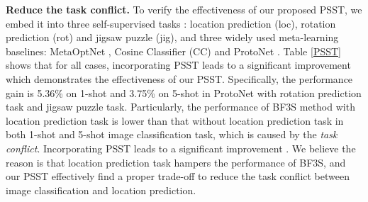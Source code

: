 \documentclass[final]{cvpr}
\begin{document}
\begin{table}[] 
	\centering
	\caption{Few-shot image classification average accuracy (\%)
		comparison with state-of-the-arts with 95\% confidence intervals on CIFAR-FS.}\label{CIFARcom}
\end{table}



\textbf{Reduce the task conflict.} 
To verify the effectiveness of our proposed PSST, we embed it into three self-supervised tasks : location prediction (loc), rotation prediction (rot) and jigsaw puzzle (jig), and three widely used meta-learning baselines: MetaOptNet \cite{LeeMRS19}, Cosine Classifier (CC) \cite{GidarisK18} and ProtoNet \cite{SnellSZ17}. 
Table \ref{PSST} shows that for all cases, incorporating PSST leads to a significant improvement which demonstrates the effectiveness of our PSST. Specifically, the performance gain is 5.36\% on 1-shot and 3.75\% on 5-shot in ProtoNet with rotation prediction task and jigsaw puzzle task. 
Particularly,
the performance of BF3S method with location prediction task is lower than that without location prediction task in both 1-shot and 5-shot image classification task, which is caused by the \textit{task conflict}.
Incorporating PSST leads to a significant improvement .
We believe the reason is that location prediction task hampers the performance of BF3S, and our PSST effectively find a proper trade-off to reduce the task conflict between image classification and location prediction.
\end{document}
